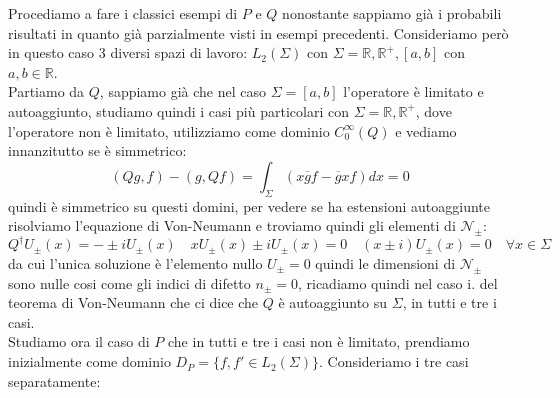 \documentclass[12pt]{book}
\theoremstyle{plain}
\newcommand{\R}{\mathbb{R}}
\theoremstyle{definition}
\theoremstyle{remark}
\begin{document}
Procediamo a fare i classici esempi di $P$ e $Q$ nonostante sappiamo già i probabili risultati in quanto già parzialmente visti in esempi precedenti. Consideriamo però in questo caso 3 diversi spazi di lavoro: $L_2(\Sigma)$ con $\Sigma = \R,\R^+,[a,b]$ con $a,b\in\R$.\\
Partiamo da $Q$, sappiamo già che nel caso $\Sigma= [a,b]$ l'operatore è limitato e autoaggiunto, studiamo quindi i casi più particolari con $\Sigma=\R,\R^+$, dove l'operatore non è limitato, utilizziamo come dominio $C_0^\infty(Q)$ e vediamo innanzitutto se è simmetrico:
\[(Qg,f)- (g,Qf) = \int_{\Sigma}(x\overline{g}f-\overline{g}xf)dx = 0 \]
quindi è simmetrico su questi domini, per vedere se ha estensioni autoaggiunte risolviamo l'equazione di Von-Neumann e troviamo quindi gli elementi di $\mathcal{N}_\pm$:
\[Q^\dagger U_\pm(x) = - \pm iU_\pm(x) \quad xU_\pm(x) \pm iU_\pm(x)=0 \quad (x\pm i)U_\pm(x) = 0 \quad \forall x\in\Sigma\]
da cui l'unica soluzione è l'elemento nullo $U_\pm = 0$ quindi le dimensioni di $\mathcal{N}_\pm$ sono nulle cosi come gli indici di difetto $n_\pm = 0$, ricadiamo quindi nel caso i. del teorema di Von-Neumann che ci dice che $Q$ è autoaggiunto su $\Sigma$, in tutti e tre i casi.\\
Studiamo ora il caso di $P$ che in tutti e tre i casi non è limitato, prendiamo inizialmente come dominio $D_P = \{f,f'\in L_2(\Sigma)\}$. Consideriamo i tre casi separatamente:
\end{document}
